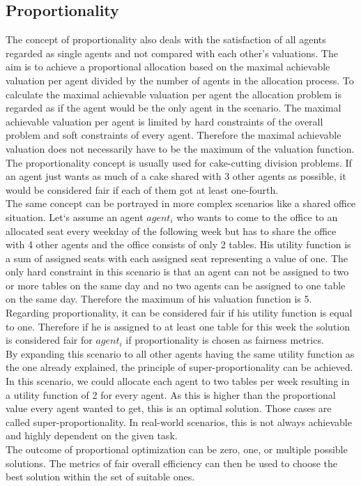 \documentclass[german, a4paper, 11pt, oneside]{scrbook}
\begin{document}
\subsection{Proportionality}
The concept of proportionality also deals with the satisfaction of all agents regarded as single agents and not compared with each other's valuations. The aim is to achieve a proportional allocation based on the maximal achievable valuation per agent divided by the number of agents in the allocation process. To calculate the maximal achievable valuation per agent the allocation problem is regarded as if the agent would be the only agent in the scenario. \cite{FelixBrandtVincentConitzerUlleEndrissJeromeLangandArielD.Procaccia.} The maximal achievable valuation per agent is limited by hard constraints of the overall problem and soft constraints of every agent. Therefore the maximal achievable valuation does not necessarily have to be the maximum of the valuation function. The proportionality concept is usually used for cake-cutting division problems. If an agent just wants as much of a cake shared with 3 other agents as possible, it would be considered fair if each of them got at least one-fourth. \\The same concept can be portrayed in more complex scenarios like a shared office situation. Let`s assume an agent $agent_i$ who wants to come to the office to an allocated seat every weekday of the following week but has to share the office with 4 other agents and the office consists of only 2 tables. His utility function is a sum of assigned seats with each assigned seat representing a value of one. The only hard constraint in this scenario is that an agent can not be assigned to two or more tables on the same day and no two agents can be assigned to one table on the same day. Therefore the maximum of his valuation function is 5.  Regarding proportionality, it can be considered fair if his utility function is equal to one. Therefore if he is assigned to at least one table for this week the solution is considered fair for $agent_i$ if proportionality is chosen as fairness metrics. \\By expanding this scenario to all other agents having the same utility function as the one already explained, the principle of super-proportionality can be achieved. In this scenario, we could allocate each agent to two tables per week resulting in a utility function of 2 for every agent. As this is higher than the proportional value every agent wanted to get, this is an optimal solution. Those cases are called super-proportionality. In real-world scenarios, this is not always achievable and highly dependent on the given task. \\The outcome of proportional optimization can be zero, one, or multiple possible solutions. The metrics of fair overall efficiency can then be used to choose the best solution within the set of suitable ones. 
\end{document}
